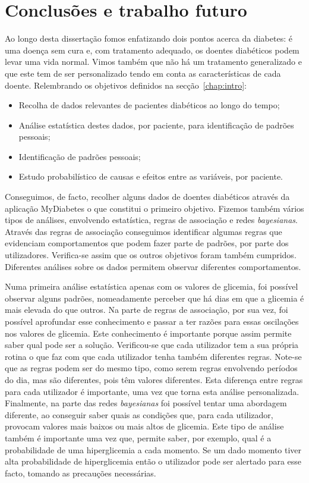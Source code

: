 \chapter{Conclusões e trabalho futuro}\label{chap:conc}

Ao longo desta dissertação fomos enfatizando dois pontos acerca da diabetes: é uma doença sem cura e, com tratamento adequado, os doentes diabéticos podem levar uma vida normal. Vimos também que não há um tratamento generalizado e que este tem de ser personalizado tendo em conta as características de cada doente. Relembrando os objetivos definidos na secção~\ref{chap:intro}:

\begin{itemize}
	\item Recolha de dados relevantes de pacientes diabéticos ao longo do tempo;
	\item Análise estatística destes dados, por paciente, para identificação de padrões pessoais;
	\item Identificação de padrões pessoais;
	\item Estudo probabilístico de causas e efeitos entre as variáveis, por paciente.
	
\end{itemize}
Conseguimos, de facto, recolher alguns dados de doentes diabéticos através da aplicação MyDiabetes o que constitui o primeiro objetivo. Fizemos também vários tipos de análises, envolvendo estatística, regras de associação e redes \textit{bayesianas}. Através das regras de associação conseguimos identificar algumas regras que evidenciam comportamentos que podem fazer parte de padrões, por parte dos utilizadores. Verifica-se assim que os outros objetivos foram também cumpridos. Diferentes análises sobre os dados permitem observar diferentes comportamentos.

Numa primeira análise estatística apenas com os valores de glicemia, foi possível observar alguns padrões, nomeadamente perceber que há dias em que a glicemia é mais elevada do que outros. Na parte de regras de associação, por sua vez, foi possível aprofundar esse conhecimento e passar a ter razões para essas oscilações nos valores de glicemia. Este conhecimento é importante porque assim permite saber qual pode ser a solução. Verificou-se que cada utilizador tem a sua própria rotina o que faz com que cada utilizador tenha também diferentes regras. Note-se que as regras podem ser do mesmo tipo, como serem regras envolvendo períodos do dia, mas são diferentes, pois têm valores diferentes. Esta diferença entre regras para cada utilizador é importante, uma vez que torna esta análise personalizada. Finalmente, na parte das redes \textit{bayesianas} foi possível tentar uma abordagem diferente, ao conseguir saber quais as condições que, para cada utilizador, provocam valores mais baixos ou mais altos de glicemia. Este tipo de análise também é importante uma vez que, permite saber, por exemplo, qual é a probabilidade de uma hiperglicemia a cada momento. Se um dado momento tiver alta probabilidade de hiperglicemia então o utilizador pode ser alertado para esse facto, tomando as precauções necessárias. 

